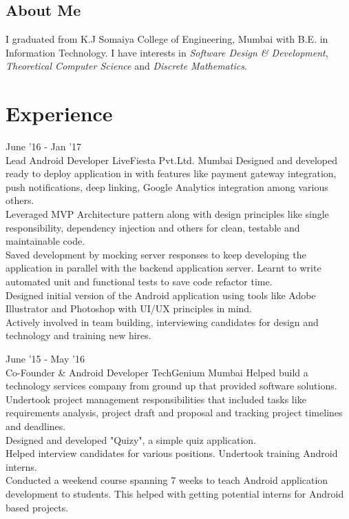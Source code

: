 \documentclass[10pt, a4paper, sans]{moderncv}
\title{}
\begin{document}
\makecvtitle

\subsection{\hfil About Me \hfil}
I graduated from K.J Somaiya College of Engineering, Mumbai with B.E. in Information Technology. I have interests in \emph{Software Design \& Development}, \emph{Theoretical Computer Science} and \emph{Discrete Mathematics}.

\section{Experience}
\cventry
{June '16 - Jan '17 \\ {\faAndroid} {\faUsers}}
{Lead Android Developer}
{LiveFiesta Pvt.Ltd.}
{Mumbai}
{}
{
{\faCaretRight} Designed and developed ready to deploy application in with features like payment gateway integration, push notifications, deep linking, Google Analytics integration among various others. \\
{\faCaretRight} Leveraged MVP Architecture pattern along with design principles like single responsibility, dependency injection and others for clean, testable and maintainable code. \\
{\faCaretRight} Saved development by mocking server responses to keep developing the application in parallel with the backend application server. Learnt to write automated unit and functional tests to save code refactor time. \\
{\faCaretRight} Designed initial version of the Android application using tools like Adobe Illustrator and Photoshop with UI/UX principles in mind. \\
{\faCaretRight} Actively involved in team building, interviewing candidates for design and technology and training new hires.
}

\cventry
{June '15 - May '16 \\ {\faAndroid} {\faBriefcase}}
{Co-Founder \& Android Developer}
{TechGenium}
{Mumbai}
{}
{
{\faCaretRight} Helped build a technology services company from ground up that provided software solutions. \\
{\faCaretRight} Undertook project management responsibilities that included tasks like requirements analysis, project draft and proposal and tracking project timelines and deadlines. \\
{\faCaretRight} Designed and developed "Quizy", a simple quiz application. \\
{\faCaretRight} Helped interview candidates for various positions. Undertook training Android interns. \\
{\faCaretRight} Conducted a weekend course spanning 7 weeks to teach Android application development to students. This helped with getting potential interns for Android based projects.
}
\end{document}
